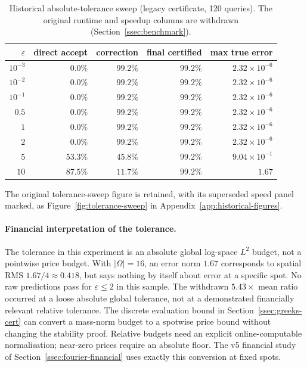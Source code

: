 \documentclass[11pt]{amsart}
\theoremstyle{remark}
\begin{document}
\begin{table}[ht]
\centering
\caption{Historical absolute-tolerance sweep (legacy certificate, 120
queries). The original runtime and speedup columns are withdrawn
(Section~\ref{ssec:benchmark}).}
\label{tab:tolerance}
\small
\begin{tabular}{rrrrr}
\toprule
$\varepsilon$ & direct accept & correction & final certified & max true error\\
\midrule
$10^{-3}$ & $0.0\%$ & $99.2\%$ & $99.2\%$ & $2.32\times10^{-6}$\\
$10^{-2}$ & $0.0\%$ & $99.2\%$ & $99.2\%$ & $2.32\times10^{-6}$\\
$10^{-1}$ & $0.0\%$ & $99.2\%$ & $99.2\%$ & $2.32\times10^{-6}$\\
$0.5$ & $0.0\%$ & $99.2\%$ & $99.2\%$ & $2.32\times10^{-6}$\\
$1$ & $0.0\%$ & $99.2\%$ & $99.2\%$ & $2.32\times10^{-6}$\\
$2$ & $0.0\%$ & $99.2\%$ & $99.2\%$ & $2.32\times10^{-6}$\\
$5$ & $53.3\%$ & $45.8\%$ & $99.2\%$ & $9.04\times10^{-1}$\\
$10$ & $87.5\%$ & $11.7\%$ & $99.2\%$ & $1.67$\\
\bottomrule
\end{tabular}
\end{table}

The original tolerance-sweep figure is retained, with its superseded speed
panel marked, as Figure~\ref{fig:tolerance-sweep} in
Appendix~\ref{app:historical-figures}.

\paragraph{Financial interpretation of the tolerance.}
The tolerance in this experiment is an absolute global log-space $L^2$ budget,
not a pointwise price budget. With $|\Omega|=16$, an error norm $1.67$
corresponds to spatial RMS $1.67/4\approx0.418$, but says nothing by itself
about error at a specific spot. No raw predictions pass for
$\varepsilon\le2$ in this sample. The withdrawn $5.43\times$ mean ratio
occurred at a loose absolute global tolerance, not at a demonstrated
financially relevant relative tolerance. The discrete evaluation bound in
Section~\ref{ssec:greeks-cert} can convert a mass-norm budget to a spotwise
price bound without changing the stability proof. Relative budgets need an
explicit online-computable normalisation; near-zero prices require an
absolute floor. The v5 financial study of Section~\ref{ssec:fourier-financial} uses
exactly this conversion at fixed spots.
\end{document}
